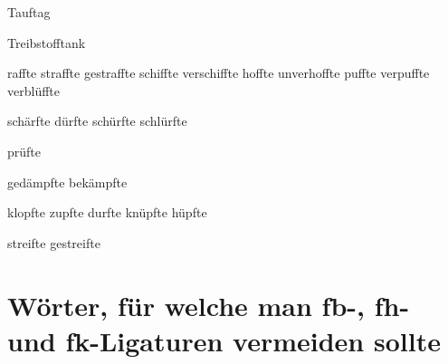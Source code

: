 Tauftag

Treibstofftank

raffte straffte gestraffte schiffte verschiffte
hoffte unverhoffte
puffte verpuffte
verblüffte

schärfte 
dürfte schürfte schlürfte

prüfte 

gedämpfte bekämpfte 

klopfte
zupfte
durfte
knüpfte hüpfte

streifte gestreifte

\section*{Wörter, für welche man \mbox{fb}-, \mbox{fh}- und \mbox{fk}-Ligaturen vermeiden sollte}

